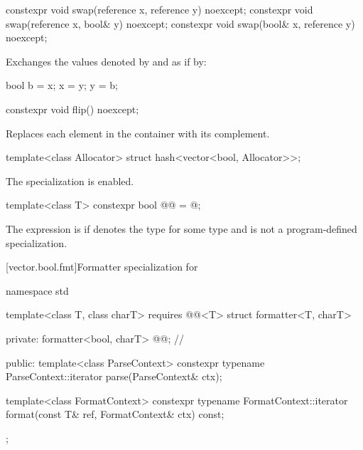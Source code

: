 %
\begin{itemdecl}
constexpr void swap(reference x, reference y) noexcept;
constexpr void swap(reference x, bool& y) noexcept;
constexpr void swap(bool& x, reference y) noexcept;
\end{itemdecl}

\begin{itemdescr}
\pnum
\effects
Exchanges the values denoted by  and  as if by:

\begin{codeblock}
bool b = x;
x = y;
y = b;
\end{codeblock}
\end{itemdescr}



%
\begin{itemdecl}
constexpr void flip() noexcept;
\end{itemdecl}

\begin{itemdescr}
\pnum
\effects
Replaces each element in the container with its complement.
\end{itemdescr}

\begin{itemdecl}
template<class Allocator> struct hash<vector<bool, Allocator>>;
\end{itemdecl}

\begin{itemdescr}
\pnum
The specialization is enabled.
\end{itemdescr}

%
\begin{itemdecl}
template<class T>
  constexpr bool @@ = @\seebelow@;
\end{itemdecl}

\begin{itemdescr}
\pnum
The expression
 is 
if  denotes the type 
for some type  and
 is not a program-defined specialization.
\end{itemdescr}

[vector.bool.fmt]{Formatter specialization for }

%
\begin{codeblock}
namespace std {
  template<class T, class charT>
    requires @@<T>
  struct formatter<T, charT> {
  private:
    formatter<bool, charT> @@;       // \expos

  public:
    template<class ParseContext>
      constexpr typename ParseContext::iterator
        parse(ParseContext& ctx);

    template<class FormatContext>
      constexpr typename FormatContext::iterator
        format(const T& ref, FormatContext& ctx) const;
  };
}
\end{codeblock}

